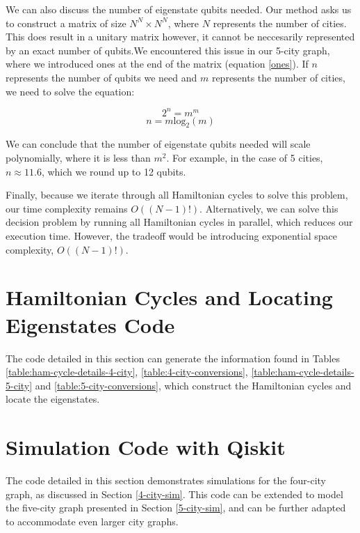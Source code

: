 \documentclass[msc,oneside]{ubcthesis}
\begin{document}
We can also discuss the number of eigenstate qubits needed. Our method asks us to construct a matrix of size $N^N \times N^N$, where $N$ represents the number of cities. This does result in a unitary matrix however, it cannot be neccesarily represented by an exact number of qubits.We encountered this issue in our 5-city graph, where we introduced ones at the end of the matrix (equation \ref{ones}). If $n$ represents the number of qubits we need and $m$ represents the number of cities, we need to solve the equation:

$$2^n = m^m$$
$$n = m\mathrm{log}_2(m)$$

We can conclude that the number of eigenstate qubits needed will scale polynomially, where it is less than $m^2$. For example, in the case of 5 cities, $n \approx 11.6$, which we round up to 12 qubits.

Finally, because we iterate through all Hamiltonian cycles to solve this problem, our time complexity remains $O((N-1)!)$. Alternatively, we can solve this decision problem by running all Hamiltonian cycles in parallel, which reduces our execution time. However, the tradeoff would be introducing exponential space complexity, $O((N-1)!)$.
	
	

	

	\appendix
	\chapter{Hamiltonian Cycles and Locating Eigenstates Code}
	
	The code detailed in this section can generate the information found in Tables \ref{table:ham-cycle-details-4-city}, \ref{table:4-city-conversions},  \ref{table:ham-cycle-details-5-city} and \ref{table:5-city-conversions}, which construct the Hamiltonian cycles and locate the eigenstates. 
	
	
	\chapter{Simulation Code with Qiskit}
	
	The code detailed in this section demonstrates simulations for the four-city graph, as discussed in Section \ref{4-city-sim}. This code can be extended to model the five-city graph presented in Section \ref{5-city-sim}, and can be further adapted to accommodate even larger city graphs.
	
	
	
	\backmatter
	
	
	
\end{document}
